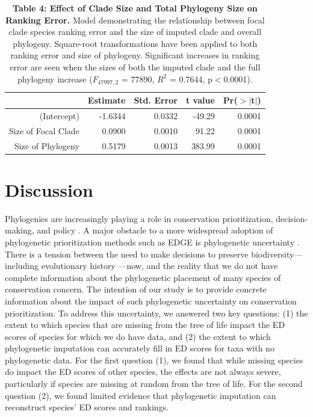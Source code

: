 \documentclass[12pt,english]{article}
\begin{document}
\begin{table}[ht]
  \centering
  \begin{tabular}{rrrrr}
    \hline
   & Estimate & Std. Error & t value & Pr($>$$|$t$|$) \\
    \hline
  (Intercept) & -1.6344 & 0.0332 & -49.29 & 0.0001 \\
    Size of Focal Clade & 0.0900 & 0.0010 & 91.22 & 0.0001 \\
    Size of Phylogeny & 0.5179 & 0.0013 & 383.99 & 0.0001 \\
     \hline
     \hline
  \end{tabular}
  \caption*{\textbf{Table 4: Effect of Clade Size and Total Phylogeny Size on
  Ranking Error.} Model demonstrating the relationship between focal clade
  species ranking error and the size of imputed clade and overall phylogeny.
  Square-root transformations have been applied to both ranking error and size
  of phylogeny. Significant increases in ranking error are seen when the sizes
  of both the imputed clade and the full phylogeny increase ($F_{47997, 2}$ =
  77890, $R^{2}$ = 0.7644, p$<$0.0001).}
  \end{table}

\clearpage
\section*{Discussion}
Phylogenies are increasingly playing a role in conservation prioritization, decision-making, and policy \autocite{Vezquez1998}. A major obstacle to a more
widespread adoption of phylogenetic prioritization methods such as EDGE is
phylogenetic uncertainty \autocite{Collen2015}. There is a tension between the
need to make decisions to preserve biodiversity---including evolutionary history
---now, and the reality that we do not have complete information about the
phylogenetic placement of many species of conservation concern. The intention of
our study is to provide concrete information about the impact of such
phylogenetic uncertainty on conservation prioritization. To address this
uncertainty, we answered two key questions: (1) the extent to which species that
are missing from the tree of life impact the ED scores of species for which we
do have data, and (2) the extent to which phylogenetic imputation can accurately
fill in ED scores for taxa with no phylogenetic data. For the first question (1),
we found that while missing species do impact the ED scores of other species,
the effects are not always severe, particularly if species are missing at random
from the tree of life. For the second question (2), we found limited evidence
that phylogenetic imputation can reconstruct species' ED scores and rankings.
\end{document}
